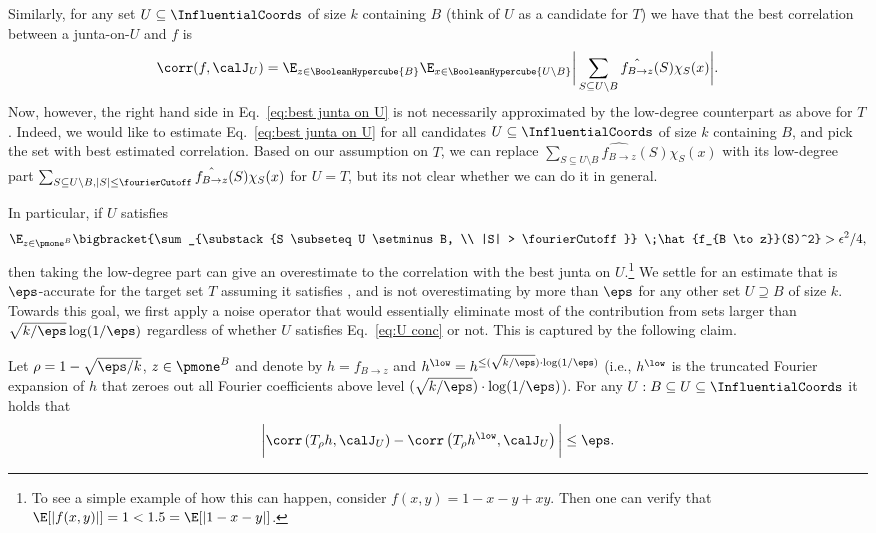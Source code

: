      
Similarly, for any  set $U\subseteq \InfluentialCoords$ of size $k$ containing $B$ (think of $U$ as a candidate for $T$) we have that the best correlation between a junta-on-$U$ and $f$ is 
\begin{equation}
\label{eq:best junta on U}
\corr(f, \calJ_{U}) = \E_{z \in \BooleanHypercube{B}} \E_{x \in \BooleanHypercube{U \setminus B}}
     \bigg | \sum_{S \subseteq U\setminus B} \hat{f_{B \to z}}(S)\chi_S(x)\bigg|.
\end{equation}
Now, however, the right hand side in Eq.~\eqref{eq:best junta on U} is not necessarily approximated by the low-degree counterpart as above for $T$.
Indeed, we would like to estimate Eq.~\eqref{eq:best junta on U} for all candidates $U\subseteq \InfluentialCoords$ of size $k$ containing $B$, and pick the set with best estimated correlation.
Based on our assumption on $T$, we can replace $\sum_{S \subseteq U\setminus B} \hat{f_{B \to z}}(S)\chi_S(x)$ with its low-degree part
$\sum_{S \subseteq U\setminus B, |S|\le \fourierCutoff} \hat{f_{B \to z}}(S)\chi_S(x)$ for $U=T$, but its not clear whether we can do it in general.

 
In particular, if $U$ satisfies 
\begin{equation}\label{eq:U conc}
\E_{z\in \pmone^{B}}\bigbracket{\sum_{\substack{S \subseteq U \setminus B, \\ |S| > \fourierCutoff}} \;\hat{f_{B \to z}}(S)^2} >\epsilon^2/4,
\end{equation}
then taking the low-degree part can give an overestimate to the correlation with the best junta on $U$.\footnote{To see a simple example of how this can happen, consider $f(x,y) = 1 -x- y+xy$. Then one can verify that $\E[|f(x,y)|] = 1 < 1.5 = \E[|1-x-y|]$.}
We settle for an estimate that is $\eps$-accurate for the target set $T$ assuming it satisfies , and is not overestimating by more than $\eps$ for any other set $U\supseteq B$ of size $k$.
Towards this goal, we first apply a noise operator that would essentially eliminate most of the contribution from sets larger than $\sqrt{k/\eps} \log(1/\eps)$ regardless of whether $U$ satisfies Eq.~\eqref{eq:U conc} or not. 
This is captured by the following claim.

\begin{claim}\label{claim:cor noise to cor noise low deg}
Let $\rho = 1-\sqrt{\eps/k}$, $z\in \pmone^B$ and denote by $h = f_{B\to z}$ and $h^{\low} = h^{\leq (\sqrt{k/\eps})\cdot \log(1/\eps)}$ (i.e., $h^{\low}$ is the truncated Fourier expansion of $h$ that zeroes out all Fourier coefficients above level $(\sqrt{k/\eps})\cdot \log(1/\eps)$).
For any $U:B \subseteq U \subseteq \InfluentialCoords$ it holds that
$$
\bigg|\corr\left(T_\rho h, \calJ_U\right) - \corr\left(T_\rho h^{\low}, \calJ_U\right)\bigg| \leq \eps.
$$

\end{claim}
 
